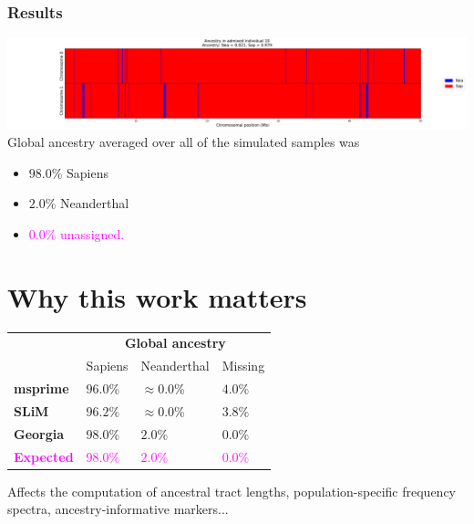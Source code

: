 \documentclass[11pt, mathserif, aspectratio=169]{beamer}
\newcommand{\magenta}[1]{\textcolor{magenta}{#1}}
\begin{document}
\begin{frame}
\frametitle{Results}
\includegraphics[scale=.22]{pics/new-method-sample.png}\quad\quad
Global ancestry averaged over all of the simulated samples was 
\begin{itemize}
\item $98.0\%$ Sapiens
\item $2.0\%$ Neanderthal
\item \magenta{$0.0\%$ unassigned.}
\end{itemize}
\end{frame}

\section{Why this work matters}

\begin{frame}
\begin{center}
\small
\centering
\begin{tabularx}{.7\textwidth}{p{2.5cm}p{1.7cm}p{1.7cm}X}
\toprule
& \multicolumn{3}{c}{{\bf Global ancestry}} \\[1mm]
 & { Sapiens} & { Neanderthal} &  Missing \\
\midrule 
{\bf msprime} & $96.0$\% & $\approx 0.0$\% & $4.0\%$  \\[3mm]
{\bf SLiM} & $96.2\%$ &  $\approx 0.0\%$ & $3.8\%$ \\[3mm]
{\bf Georgia} & $98.0\%$ & $2.0\%$ & $0.0\%$  \\[3mm]
\midrule
{\bf\magenta{Expected}} & \magenta{$98.0\%$} & \magenta{$2.0\%$} & \magenta{$0.0\%$} \\[1mm]
\bottomrule
\end{tabularx}
\end{center}
\vspace{5mm}
Affects the computation of ancestral tract lengths, population-specific frequency spectra, ancestry-informative markers...
\end{frame}
\end{document}
